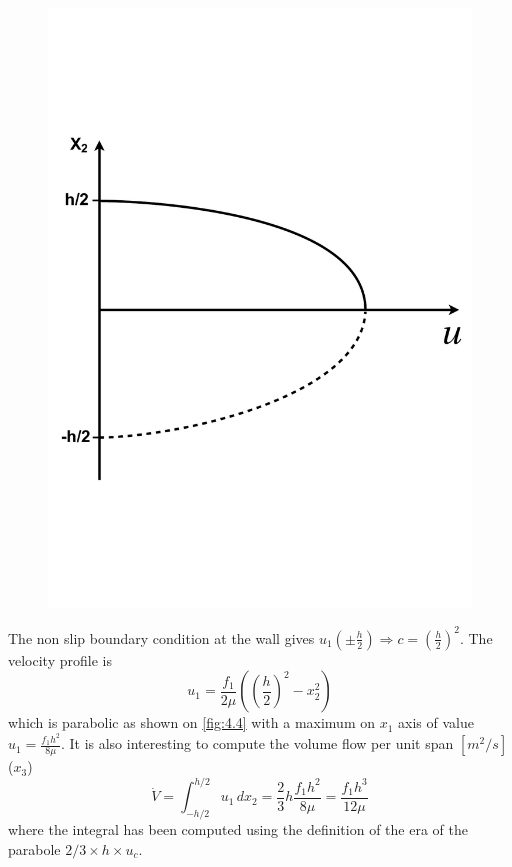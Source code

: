 		\begin{figure}
		\vspace{-5mm}
		\includegraphics[scale=0.2]{ch4/4}
		\label{fig:4.4}
		\end{figure}
		The non slip boundary condition at the wall gives $u_1(\pm \frac{h}{2}) \Rightarrow c =\left( \frac{h}{2}\right)^2$. The velocity profile is 
		\begin{equation}
			u_1 = \frac{f_1}{2\mu} \left(\left(\frac{h}{2}\right)^2-x_2^2\right)
			\label{eq:4.8}
		\end{equation}
		which is parabolic as shown on \autoref{fig:4.4} with a maximum on $x_1$ axis of value $u_1 = \frac{f_1h^2}{8\mu}$. It is also interesting to compute the volume flow per unit span $[m^2/s]$ ($x_3$) 
		\begin{equation}
			\dot{V} = \int _{-h/2}^{h/2} u_1 \, dx_2 = \frac{2}{3} h \frac{f_1h^2}{8\mu} = \frac{f_1h^3}{12\mu} 
		\end{equation}
		where the integral has been computed using the definition of the era of the parabole $2/3 \times h \times u_c$. 
		
